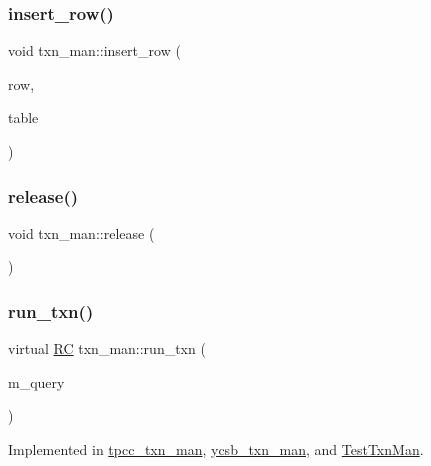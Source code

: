 \subsubsection{\texorpdfstring{insert\+\_\+row()}{insert\_row()}}
{\footnotesize\ttfamily void txn\+\_\+man\+::insert\+\_\+row (\begin{DoxyParamCaption}\item[{\hyperlink{classrow__t}{row\+\_\+t} $\ast$}]{row,  }\item[{\hyperlink{classtable__t}{table\+\_\+t} $\ast$}]{table }\end{DoxyParamCaption})\hspace{0.3cm}{\ttfamily [protected]}}

\mbox{\label{classtxn__man_ae9762ca0f1e6fcac2094ea284375aa6e}} 
\subsubsection{\texorpdfstring{release()}{release()}}
{\footnotesize\ttfamily void txn\+\_\+man\+::release (\begin{DoxyParamCaption}{ }\end{DoxyParamCaption})}

\mbox{\label{classtxn__man_a71142ded36a4be5629ea75d486a105ae}} 
\subsubsection{\texorpdfstring{run\+\_\+txn()}{run\_txn()}}
{\footnotesize\ttfamily virtual \hyperlink{global_8h_a78c49a674c810fdd03d20432f7be864a}{RC} txn\+\_\+man\+::run\+\_\+txn (\begin{DoxyParamCaption}\item[{\hyperlink{classbase__query}{base\+\_\+query} $\ast$}]{m\+\_\+query }\end{DoxyParamCaption})\hspace{0.3cm}{\ttfamily [pure virtual]}}



Implemented in \hyperlink{classtpcc__txn__man_a19f99ffaf91e1f977fe517d617493a8a}{tpcc\+\_\+txn\+\_\+man}, \hyperlink{classycsb__txn__man_ab219e46d2d5149677ad391ebb83d6e05}{ycsb\+\_\+txn\+\_\+man}, and \hyperlink{classTestTxnMan_ae9510bd3f827a29dcc1239517021ac37}{Test\+Txn\+Man}.

